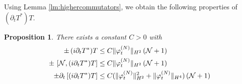 \documentclass[11pt,a4paper,DIV11]{scrartcl}	%
\newtheorem{proposition}[thm]{Proposition}
\newcommand{\cN}{{\cal N}}
\begin{document}
Using Lemma \ref{lm:highercommutators}, we obtain the following properties of $(\partial_t T^*)T$.
\begin{proposition}
There exists a constant $C>0$ with 
\begin{equation}\begin{split}
\label{eq:prT-cl1}  \pm \, (i\partial_t T^*) T &\leq C \| \varphi_t^{(N)} \|_{H^2} \,  (\cN +1) \\
\pm \, \left[ \cN , (i\partial_t T^*) T \right]  &\leq C \| \varphi_t^{(N)} \|_{H^2} \, (\cN + 1) \\
\pm \partial_t \left[ (i\partial_t T^*) T \right] &\leq C (\| \varphi_t^{(N)} \|^2_{H^2} + \| \varphi_t^{(N)} \|_{H^4}) \, (\cN +1) 
\end{split}
\end{equation}
\end{proposition}
\end{document}
